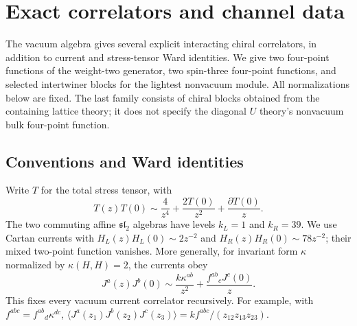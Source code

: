 \section{Exact correlators and channel data}
\label{sec:physics-correlators}

The vacuum algebra gives several explicit interacting chiral correlators,
in addition to current and stress-tensor Ward identities.  We give two
four-point functions of the weight-two generator, two spin-three four-point
functions, and selected intertwiner blocks for the lightest nonvacuum
module.  All normalizations below are fixed.  The last family consists of
chiral blocks obtained from the containing lattice theory; it does not
specify the diagonal $U$ theory's nonvacuum bulk four-point function.

\subsection{Conventions and Ward identities}

Write $T$ for the total stress tensor, with
\begin{equation}
 T(z)T(0)\sim \frac{4}{z^4}+\frac{2T(0)}{z^2}
                   +\frac{\partial T(0)}{z}.
\end{equation}
The two commuting affine $\mathfrak{sl}_2$ algebras have levels
$k_L=1$ and $k_R=39$.  We use Cartan currents with
$H_L(z)H_L(0)\sim2z^{-2}$ and
$H_R(z)H_R(0)\sim78z^{-2}$; their mixed two-point function vanishes.
More generally, for invariant form $\kappa$ normalized by
$\kappa(H,H)=2$, the currents obey
\begin{equation}
 J^a(z)J^b(0)\sim\frac{k\kappa^{ab}}{z^2}
               +\frac{f^{ab}{}_cJ^c(0)}{z}.
\end{equation}
This fixes every vacuum current correlator recursively.  For example,
with $f^{abc}=f^{ab}{}_d\kappa^{dc}$,
$\langle J^a(z_1)J^b(z_2)J^c(z_3)\rangle
=k f^{abc}/(z_{12}z_{13}z_{23})$.

